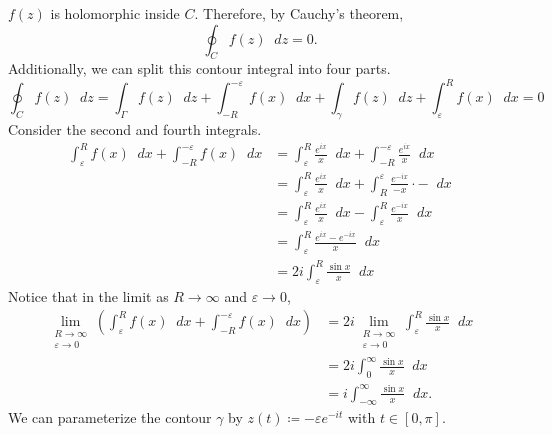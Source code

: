 \documentclass[a4paper]{article}
\newcommand*\diff{\mathop{}\!d} %
\theoremstyle{definition}
\begin{document}
$f(z)$ is holomorphic inside $C$.
Therefore, by Cauchy's theorem,
\begin{equation*}
    \oint_{C} f(z) \diff z = 0.
\end{equation*}
Additionally, we can split this contour integral into four parts.
\begin{equation*}
    \oint_{C} f(z) \diff z = \int_{\Gamma} f(z) \diff z + \int_{-R}^{-\varepsilon} f(x) \diff x + \int_{\gamma} f(z) \diff z + \int_{\varepsilon}^{R} f(x) \diff x = 0
\end{equation*}
Consider the second and fourth integrals.
\begin{align*}
    \int_{\varepsilon}^{R} f(x) \diff x + \int_{-R}^{-\varepsilon} f(x) \diff x & = \int_{\varepsilon}^{R} \frac{e^{ix}}{x} \diff x + \int_{-R}^{-\varepsilon} \frac{e^{ix}}{x} \diff x         \\
                                                                                & = \int_{\varepsilon}^{R} \frac{e^{ix}}{x} \diff x + \int_{R}^{\varepsilon} \frac{e^{-ix}}{-x} \cdot - \diff x \\
                                                                                & = \int_{\varepsilon}^{R} \frac{e^{ix}}{x} \diff x - \int_{\varepsilon}^{R} \frac{e^{-ix}}{x} \diff x          \\
                                                                                & = \int_{\varepsilon}^{R} \frac{e^{ix} - e^{-ix}}{x} \diff x                                                   \\
                                                                                & = 2i \int_{\varepsilon}^{R} \frac{ \sin x}{x} \diff x
\end{align*}
Notice that in the limit as $R \to \infty$ and $\varepsilon \to 0$,
\begin{align*}
    \lim_{\substack{R \to \infty                             \\ \varepsilon \to 0}} \left( \int_{\varepsilon}^{R} f(x) \diff x + \int_{-R}^{-\varepsilon} f(x) \diff x \right)  &= 2i \lim_{\substack{R \to \infty \\ \varepsilon \to 0}} \int_{\varepsilon}^{R} \frac{\sin x}{x} \diff x \\
     & = 2i \int_{0}^{\infty} \frac{\sin x}{x} \diff x       \\
     & = i \int_{-\infty}^{\infty} \frac{\sin x}{x} \diff x.
\end{align*}
We can parameterize the contour $\gamma$ by $z(t) \coloneq -\varepsilon e^{-it}$ with $t \in [0, \pi]$.
\end{document}
